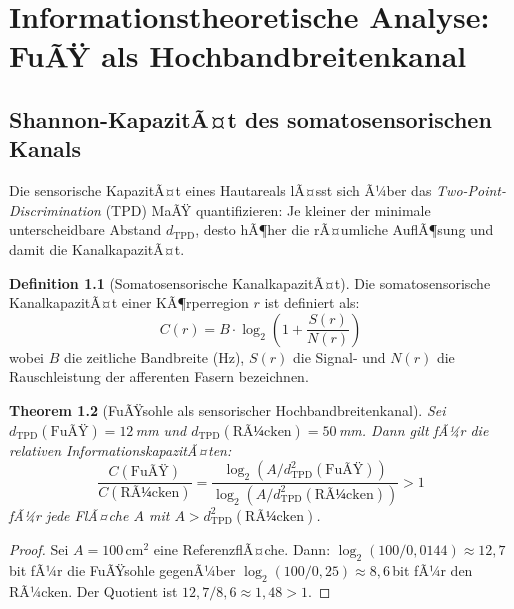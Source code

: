 ﻿\documentclass[12pt,a4paper]{report}
\theoremstyle{plain}
\newtheorem{theorem}{Theorem}[section]
\theoremstyle{definition}
\newtheorem{definition}[theorem]{Definition}
\theoremstyle{remark}
\begin{document}
\chapter{Informationstheoretische Analyse: FuÃŸ als Hochbandbreitenkanal}

\section{Shannon-KapazitÃ¤t des somatosensorischen Kanals}

Die sensorische KapazitÃ¤t eines Hautareals lÃ¤sst sich Ã¼ber das
\emph{Two-Point-Discrimination} (TPD) MaÃŸ quantifizieren: Je kleiner der
minimale unterscheidbare Abstand $d_{\text{TPD}}$, desto hÃ¶her die rÃ¤umliche
AuflÃ¶sung und damit die KanalkapazitÃ¤t.

\begin{definition}[Somatosensorische KanalkapazitÃ¤t]
Die somatosensorische KanalkapazitÃ¤t einer KÃ¶rperregion $r$ ist definiert als:
\[
  C(r) = B \cdot \log_2\left(1 + \frac{S(r)}{N(r)}\right)
\]
wobei $B$ die zeitliche Bandbreite (Hz), $S(r)$ die Signal- und
$N(r)$ die Rauschleistung der afferenten Fasern bezeichnen.
\end{definition}

\begin{theorem}[FuÃŸsohle als sensorischer Hochbandbreitenkanal]
Sei $d_{\mathrm{TPD}}(\text{FuÃŸ}) = 12$\,mm und
$d_{\mathrm{TPD}}(\text{RÃ¼cken}) = 50$\,mm. Dann gilt fÃ¼r die
relativen InformationskapazitÃ¤ten:
\[
  \frac{C(\text{FuÃŸ})}{C(\text{RÃ¼cken})} = \frac{\log_2(A/d_{\mathrm{TPD}}^2(\text{FuÃŸ}))}
  {\log_2(A/d_{\mathrm{TPD}}^2(\text{RÃ¼cken}))} > 1
\]
fÃ¼r jede FlÃ¤che $A$ mit $A > d_{\mathrm{TPD}}^2(\text{RÃ¼cken})$.
\end{theorem}

\begin{proof}
Sei $A = 100\,\text{cm}^2$ eine ReferenzflÃ¤che.
Dann: $\log_2(100/0{,}0144) \approx 12{,}7$\,bit fÃ¼r die FuÃŸsohle gegenÃ¼ber
$\log_2(100/0{,}25) \approx 8{,}6$\,bit fÃ¼r den RÃ¼cken.
Der Quotient ist $12{,}7/8{,}6 \approx 1{,}48 > 1$.
\end{proof}
\end{document}
